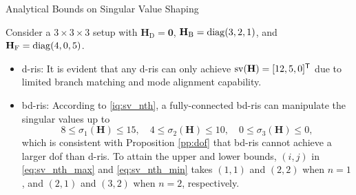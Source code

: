 \begin{section}{Analytical Bounds on Singular Value Shaping}
	\begin{example}\label{eg:bounds}
		Consider a $3 \times 3 \times 3$ setup with $\mathbf{H}_\mathrm{D} = \mathbf{0}$, $\mathbf{H}_\mathrm{B} = \operatorname{diag}(3, 2, 1)$, and $\mathbf{H}_\mathrm{F} = \operatorname{diag}(4, 0, 5)$.
		\begin{itemize}
			\item \gls{d}-\gls{ris}: It is evident that any \gls{d}-\gls{ris} can only achieve $\operatorname{sv}(\mathbf{H}) = [12, 5, 0]^\mathsf{T}$ due to limited branch matching and mode alignment capability.
			\item \gls{bd}-\gls{ris}: According to \eqref{iq:sv_nth}, a fully-connected \gls{bd}-\gls{ris} can manipulate the singular values up to
				\begin{equation*}
					8 \le \sigma_1(\mathbf{H}) \le 15, \quad 4 \le \sigma_2(\mathbf{H}) \le 10, \quad 0 \le \sigma_3(\mathbf{H}) \le 0,
				\end{equation*}
				which is consistent with Proposition \ref{pp:dof} that \gls{bd}-\gls{ris} cannot achieve a larger \gls{dof} than \gls{d}-\gls{ris}.
				To attain the upper and lower bounds, $(i,j)$ in \eqref{eq:sv_nth_max} and \eqref{eq:sv_nth_min} takes $(1, 1)$ and $(2, 2)$ when $n=1$, and $(2, 1)$ and $(3, 2)$ when $n=2$, respectively.

\end{itemize}
\end{example}
\end{section}

